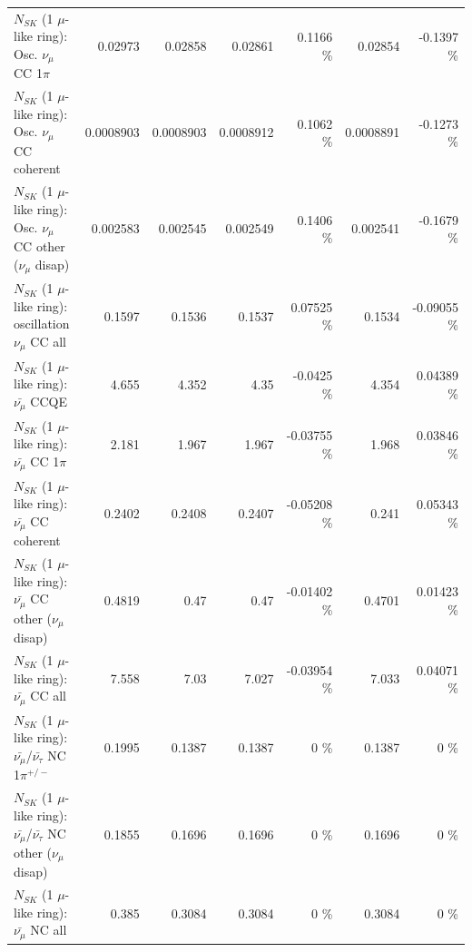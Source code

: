 \begin{table}
\begin{tabular}{| l | r | r | r  r | r  r |}
                          $N_{SK}$ (1 $\mu$-like ring): Osc. $\nu_\mu$ CC 1$\pi$ &         0.02973 &         0.02858 &         0.02861 &   0.1166 \%  &         0.02854 &  -0.1397 \%  \\ 
                        $N_{SK}$ (1 $\mu$-like ring): Osc. $\nu_\mu$ CC coherent &       0.0008903 &       0.0008903 &       0.0008912 &   0.1062 \%  &       0.0008891 &  -0.1273 \%  \\ 
         $N_{SK}$ (1 $\mu$-like ring): Osc. $\nu_\mu$ CC other ($\nu_\mu$ disap) &        0.002583 &        0.002545 &        0.002549 &   0.1406 \%  &        0.002541 &  -0.1679 \%  \\ 
                      $N_{SK}$ (1 $\mu$-like ring): oscillation $\nu_\mu$ CC all &          0.1597 &          0.1536 &          0.1537 &  0.07525 \%  &          0.1534 & -0.09055 \%  \\ 
\hline
\hline
                              $N_{SK}$ (1 $\mu$-like ring): $\bar{\nu_\mu}$ CCQE &           4.655 &           4.352 &            4.35 &  -0.0425 \%  &           4.354 &  0.04389 \%  \\ 
                         $N_{SK}$ (1 $\mu$-like ring): $\bar{\nu_\mu}$ CC 1$\pi$ &           2.181 &           1.967 &           1.967 & -0.03755 \%  &           1.968 &  0.03846 \%  \\ 
                       $N_{SK}$ (1 $\mu$-like ring): $\bar{\nu_\mu}$ CC coherent &          0.2402 &          0.2408 &          0.2407 & -0.05208 \%  &           0.241 &  0.05343 \%  \\ 
        $N_{SK}$ (1 $\mu$-like ring): $\bar{\nu_\mu}$ CC other ($\nu_\mu$ disap) &          0.4819 &            0.47 &            0.47 & -0.01402 \%  &          0.4701 &  0.01423 \%  \\ 
                          $N_{SK}$ (1 $\mu$-like ring): $\bar{\nu_{\mu}}$ CC all &           7.558 &            7.03 &           7.027 & -0.03954 \%  &           7.033 &  0.04071 \%  \\ 
\hline
  $N_{SK}$ (1 $\mu$-like ring): $\bar{\nu_\mu}$/$\bar{\nu_\tau}$ NC 1$\pi^{+/-}$ &          0.1995 &          0.1387 &          0.1387 &        0 \%  &          0.1387 &        0 \%  \\ 
$N_{SK}$ (1 $\mu$-like ring): $\bar{\nu_\mu}$/$\bar{\nu_\tau}$ NC other ($\nu_\mu$ disap) &          0.1855 &          0.1696 &          0.1696 &        0 \%  &          0.1696 &        0 \%  \\ 
                          $N_{SK}$ (1 $\mu$-like ring): $\bar{\nu_{\mu}}$ NC all &           0.385 &          0.3084 &          0.3084 &        0 \%  &          0.3084 &        0 \%  \\ 

\end{tabular}
\end{table}

